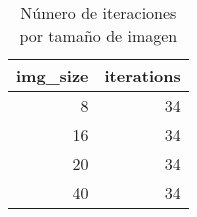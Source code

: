 \begin{table}
\caption{Número de iteraciones por tamaño de imagen}
\label{tab:iteraciones}
\begin{tabular}{rr}
\toprule
img_size & iterations \\
\midrule
8 & 34 \\
16 & 34 \\
20 & 34 \\
40 & 34 \\
\bottomrule
\end{tabular}
\end{table}

